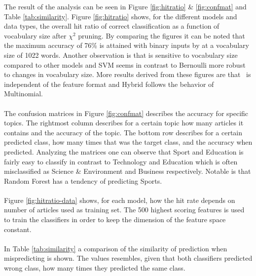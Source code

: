 The result of the analysis can be seen in Figure \ref{fig:hitratio} \& \ref{fig:confmat} and Table \ref{tab:similarity}. Figure \ref{fig:hitratio} shows, for the different models and data types, the overall hit ratio of correct classification as a function of vocabulary size after $\chi^2$ pruning. By comparing the figures it can be noted that the maximum accuracy of 76\% is attained with binary inputs by \mn at a vocabulary size of 1022 words. Another observation is that \bn is sensitive to vocabulary size compared to other models and SVM seems in contrast to Bernoulli more robust to changes in vocabulary size. More results derived from these figures are that \rf\ is independent of the feature format and Hybrid follows the behavior of Multinomial.
\\\\
The confusion matrices in Figure \ref{fig:confmat} describes the accuracy for specific topics. The rightmost column describes for a certain topic how many articles it contains and the accuracy of the topic. The bottom row describes for a certain predicted class, how many times that was the target class, and the accuracy when predicted. Analyzing the matrices one can observe that Sport and Education is fairly easy to classify in contrast to Technology and Education which is often misclassified as Science \& Environment and Business respectively. Notable is that Random Forest has a tendency of predicting Sports.
\\\\
Figure \ref{fig:hitratio-data} shows, for each model, how the hit rate depends on number of articles used as training set. The 500 highest scoring features is used to train the classifiers in order to keep the dimension of the feature space constant.
\\\\
In Table \ref{tab:similarity} a comparison of the similarity of prediction when mispredicting is shown. The values resembles, given that both classifiers predicted wrong class, how many times they predicted the same class.

\onecolumn

\onecolumn

\onecolumn

\twocolumn
